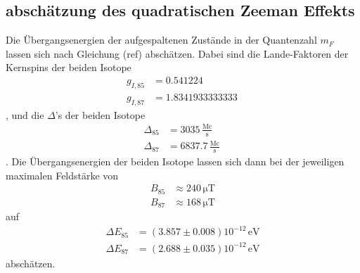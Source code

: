 \subsection{abschätzung des quadratischen Zeeman Effekts}
\label{sec:Zeeman}
Die Übergangsenergien der aufgespaltenen Zustände in der Quantenzahl $m_F$ lassen sich nach Gleichung (ref) abschätzen. Dabei sind die Lande-Faktoren der Kernspins der beiden Isotope 
\begin{align*}
  g_{I, 85} &= 0.541224 \\
  g_{I, 87} &= 1.8341933333333 \, 
\end{align*}
\cite{nuc_lande}, und die $\Delta$'s der beiden Isotope
\begin{align*}
  \Delta_{85} &= 3035 \, \frac{\mathrm{Mc}}{\mathrm{s}} \\
  \Delta_{87} &= 6837.7 \, \frac{\mathrm{Mc}}{\mathrm{s}} \,
\end{align*}
\cite{benumof}. Die Übergangsenergien der beiden Isotope lassen sich dann bei der jeweiligen maximalen Feldstärke von 
\begin{align*}
  B_{85} &\approx  240 \, \mathrm{\mu T}\\
  B_{87} &\approx  168 \, \mathrm{\mu T}
\end{align*}
auf 
\begin{align*}
  \Delta E_{85} &=  \left( 3.857 \pm 0.008 \right) 10^{-12} \, \text{eV} \\
  \Delta E_{87} &=  \left( 2.688 \pm 0.035 \right) 10^{-12} \, \text{eV}
\end{align*}
abschätzen. 